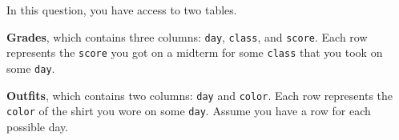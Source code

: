 \question In this question, you have access to two tables.

\textbf{Grades}, which contains three columns: \lstinline{day}, \lstinline{class}, and \lstinline{score}. Each row represents the \lstinline{score} you got on a midterm for some \lstinline{class} that you took on some \lstinline{day}.

\textbf{Outfits}, which contains two columns: \lstinline{day} and \lstinline{color}. Each row represents the \lstinline{color} of the shirt you wore on some \lstinline{day}. Assume you have a row for each possible day.

